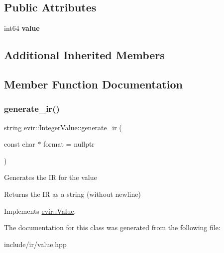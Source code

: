 \subsection*{Public Attributes}
\begin{DoxyCompactItemize}
\item 
\mbox{\label{classevir_1_1IntegerValue_aa93d03b5f0b6a7de8267d18de1b1774b}} 
int64 {\bfseries value}
\end{DoxyCompactItemize}
\subsection*{Additional Inherited Members}


\subsection{Member Function Documentation}
\mbox{\label{classevir_1_1IntegerValue_a586411c365b2afc18fbd5960dd053d94}} 
\subsubsection{\texorpdfstring{generate\+\_\+ir()}{generate\_ir()}}
{\footnotesize\ttfamily string evir\+::\+Integer\+Value\+::generate\+\_\+ir (\begin{DoxyParamCaption}\item[{const char $\ast$}]{format = {\ttfamily nullptr} }\end{DoxyParamCaption})\hspace{0.3cm}{\ttfamily [virtual]}}

Generates the IR for the value \begin{DoxyReturn}{Returns}
the IR as a string (without newline) 
\end{DoxyReturn}


Implements \hyperlink{classevir_1_1Value_a3e7e5bc634fd5bba528324076fe2a763}{evir\+::\+Value}.



The documentation for this class was generated from the following file\+:\begin{DoxyCompactItemize}
\item 
include/ir/value.\+hpp\end{DoxyCompactItemize}
